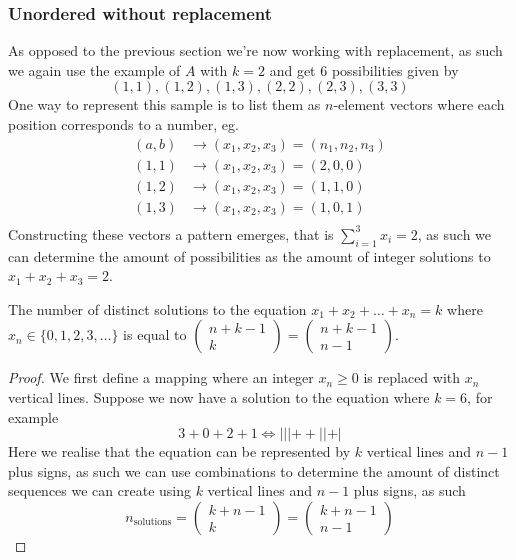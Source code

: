 \subsubsection{Unordered without replacement}
As opposed to the previous section we're now working with replacement, as such we again use the example of $A$ with $k=2$ and get 6 possibilities given by
\[
    (1,1),(1,2),(1,3),(2,2),(2,3),(3,3)
\]
One way to represent this sample is to list them as $n$-element vectors where each position corresponds to a number, eg.
\begin{align*}
    (a,b)&\rightarrow(x_{1},x_{2},x_{3})=(n_{1},n_{2},n_{3}) \\
    (1,1)&\rightarrow(x_{1},x_{2},x_{3})=(2,0,0) \\
    (1,2)&\rightarrow(x_{1},x_{2},x_{3})=(1,1,0) \\
    (1,3)&\rightarrow(x_{1},x_{2},x_{3})=(1,0,1) \\
\end{align*}
Constructing these vectors a pattern emerges, that is $\sum_{i=1}^{3}x_{i}=2$, as such we can determine the amount of possibilities as the amount of integer solutions to $x_{1}+x_{2}+x_{3}=2$.
\begin{theorem}
    The number of distinct solutions to the equation $x_{1}+x_{2}+\ldots+x_{n}=k$ where $x_{n}\in\{0,1,2,3,\ldots\}$ is equal to $\begin{pmatrix}n+k-1\\k\end{pmatrix}=\begin{pmatrix}n+k-1\\n-1\end{pmatrix}$.
\end{theorem}
\begin{proof}
  We first define a mapping where an integer $x_{n}\geq 0$ is replaced with $x_{n}$ vertical lines. Suppose we now have a solution to the equation where $k=6$, for example
  \[
      3+0+2+1\Leftrightarrow |||++||+|
  \]
  Here we realise that the equation can be represented by $k$ vertical lines and $n-1$ plus signs, as such we can use combinations to determine the amount of distinct sequences we can create using $k$ vertical lines and $n-1$ plus signs, as such
  \[
      n_{\text{solutions}}=\begin{pmatrix}k+n-1\\k\end{pmatrix}=\begin{pmatrix}k+n-1\\n-1\end{pmatrix}
  \]
\end{proof}
